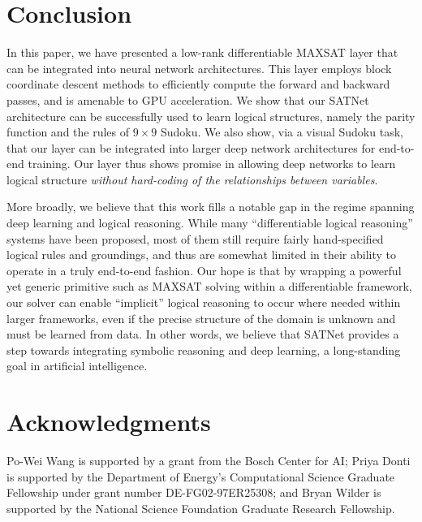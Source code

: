 \documentclass{article}
\begin{document}
	\section{Conclusion}
	In this paper, we have presented a low-rank differentiable MAXSAT layer that can be integrated into neural network architectures.
	This layer employs block coordinate descent methods to efficiently compute the forward and backward passes, and is amenable to GPU acceleration.
	We show that our SATNet architecture can be successfully used to learn logical structures, namely the parity function and the rules of $9 \times 9$ Sudoku.
	We also show, via a visual Sudoku task, that our layer can be integrated into larger deep network architectures for end-to-end training.
	Our layer thus shows promise in allowing deep networks to learn logical structure \emph{without hard-coding of the relationships between variables}.
	
	More broadly, we believe that this work fills a notable gap in the regime spanning deep learning and logical reasoning.  
	While many ``differentiable logical reasoning'' systems have been proposed, most of them still require 
	fairly hand-specified logical rules and groundings, 
	and thus are somewhat limited in their ability to operate in a truly end-to-end fashion.  
Our hope is that by wrapping a powerful yet generic primitive such as MAXSAT solving within a differentiable framework, 
	our solver can enable ``implicit'' logical reasoning to occur where needed within larger frameworks, even if the precise structure of the domain is unknown and must be learned from data.  
	In other words, we believe that SATNet provides a step towards integrating symbolic reasoning and deep learning, a long-standing goal in artificial intelligence. 

	\section*{Acknowledgments}
	Po-Wei Wang is supported by a grant from the Bosch Center for AI; Priya Donti is supported by the Department of Energy's Computational Science Graduate Fellowship under grant number DE-FG02-97ER25308; and Bryan Wilder is supported by the National Science Foundation Graduate Research Fellowship.
	
	
	
	
	\clearpage
	\newpage
	\appendix
	
\end{document}
